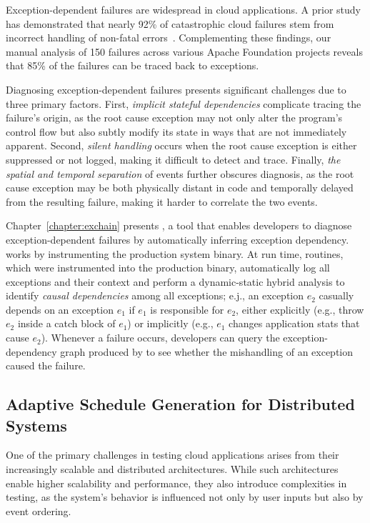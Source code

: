 Exception-dependent failures are widespread in cloud applications. A prior study has demonstrated that nearly 92\% of catastrophic cloud failures stem from incorrect handling of non-fatal errors~\cite{Ding14-testfailure}. Complementing these findings, our manual analysis of 150 failures across various Apache Foundation projects reveals that 85\% of the failures can be traced back to exceptions.

Diagnosing exception-dependent failures presents significant challenges due to three primary factors. First, \emph{implicit stateful dependencies} complicate tracing the failure’s origin, as the root cause exception may not only alter the program’s control flow but also subtly modify its state in ways that are not immediately apparent. Second, \emph{silent handling} occurs when the root cause exception is either suppressed or not logged, making it difficult to detect and trace. Finally, \emph{the spatial and temporal separation} of events further obscures diagnosis, as the root cause exception may be both physically distant in code and temporally delayed from the resulting failure, making it harder to correlate the two events.



Chapter~\ref{chapter:exchain} presents {\exchain}, a tool that enables developers to diagnose exception-dependent failures by automatically inferring exception dependency. {\exchain} works by instrumenting the production system binary. At run time,  {\exchain} routines, which were instrumented into the production binary, automatically log all exceptions and their context and perform a dynamic-static hybrid analysis to identify \emph{causal dependencies} among all exceptions; e.j., an exception $e_2$ casually depends on an exception $e_1$ if $e_1$ is responsible for $e_2$, either explicitly (e.g., throw $e_2$ inside a catch block of $e_1$) or implicitly (e.g., $e_1$ changes application stats that cause $e_2$). Whenever a failure occurs, developers can query the exception-dependency graph produced by {\exchain} to see whether the mishandling of an exception caused the failure. 

\subsection{Adaptive Schedule Generation for Distributed Systems}

One of the primary challenges in testing cloud applications arises from their increasingly scalable and distributed architectures. While such architectures enable higher scalability and performance, they also introduce complexities in testing, as the system’s behavior is influenced not only by user inputs but also by event ordering.

